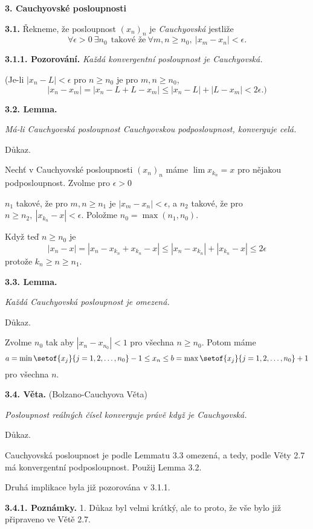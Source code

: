 \documentclass[12pt]{article}
\begin{document}
  
  
 \vskip10mm
 
  {\large\bf 3. Cauchyovské posloupnosti}
 
 \bigskip
 
 {\bf 3.1.} Řekneme, že posloupnost $(x_n)_n$ je {\em Cauchyovská} jestliže
 $$
 \forall \epsilon>0 \ \exists n_0\ \ \text{takové že}\ \forall m,n\geq n_0, \ |x_m-x_n|<\epsilon.
 $$
 
 \medskip
 
 {\bf 3.1.1. Pozorování.} {\em Každá konvergentní posloupnost je Cauchyovská.}
 
 (Je-li $|x_n-L|<\epsilon$ pro $n\geq n_0$ je pro $m,n\geq n_0$,
 $$
 |x_n-x_m|=|x_n-L+L-x_m| \leq|x_n-L|+|L-x_m|<2\epsilon.)
 $$
  
 \bigskip
 
 {\bf 3.2. Lemma.} {\em Má-li Cauchyovská posloupnost Cauchyovskou podposloupnost, konverguje celá.
 
 Důkaz.} Nechť v Cauchyovské posloupnosti $(x_n)_n$ máme $\lim x_{k_n}=x$ pro nějakou podposloupnost. Zvolme pro $\epsilon>0$
 
$n_1$ takové, že pro $m,n\geq n_1$ je $|x_m-x_n|<\epsilon$, a $n_2$ takové, že pro
 $n\geq n_2, \ |x_{k_n}-x|<\epsilon$. Položme $n_0=\max(n_1,n_0)$.
 
 Když teď $n\geq n_0$ je
 $$
 |x_n-x|=|x_n-x_{k_n}+x_{k_n}-x|\leq|x_n-x_{k_n}|+|x_{k_n}-x|\leq 2\epsilon
 $$
protože $k_n\geq n\geq n_1$. \sq
 
 \bigskip
 
 {\bf 3.3. Lemma.} {\em Každá Cauchyovská posloupnost je omezená.
  
 Důkaz.} Zvolme $n_0$ tak aby $|x_n-x_{n_0}|<1$ pro všechna $n\geq n_0$. Potom máme
 $$
 a=\min\setof{x_j}{j=1,2,\dots,n_0} -1\leq x_n\leq b=\max\setof{x_j}{j=1,2,\dots,n_0}+1
 $$
 pro všechna $n$. \sq
 
 \bigskip
 
 {\bf 3.4. Věta.} (Bolzano-Cauchyova Věta) {\em Posloupnost reálných čísel konverguje právě když je Cauchyovská.

 Důkaz.}  Cauchyovská posloupnost je podle Lemmatu 3.3 omezená, a tedy, podle Věty 2.7 má konvergentní podposloupnost. Použij
 Lemma 3.2. 
 
 Druhá implikace byla již pozorována v 3.1.1. \sq
 
 \medskip
 
 {\bf 3.4.1. Poznámky.} 1.  Důkaz byl velmi krátký,  ale to proto, že vše bylo již připraveno ve Větě 2.7.
 
\end{document}
